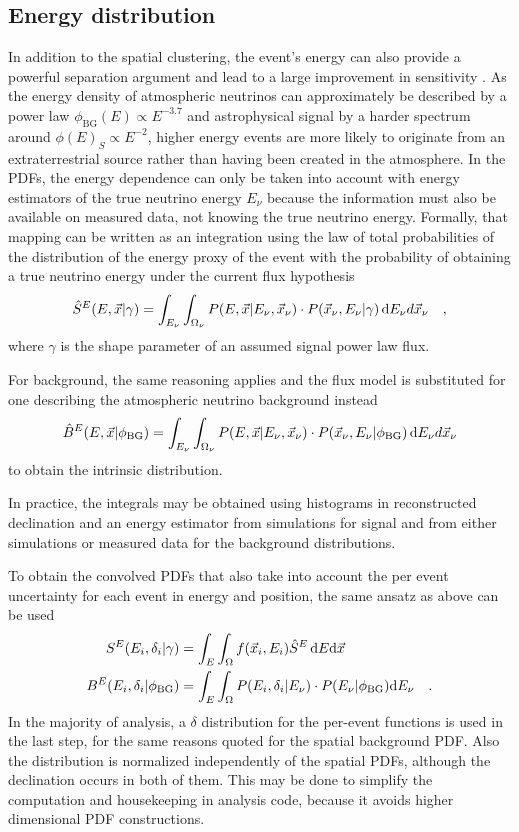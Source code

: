 \subsection{Energy distribution}
In addition to the spatial clustering, the event's energy can also provide a powerful separation argument and lead to a large improvement in sensitivity .
As the energy density of atmospheric neutrinos can approximately be described by a power law $\phi_\mathrm{BG}(E) \propto E^{-3.7}$ and astrophysical signal by a harder spectrum around $\phi(E)_S \propto E^{-2}$, higher energy events are more likely to originate from an extraterrestrial source rather than having been created in the atmosphere.
In the PDFs, the energy dependence can only be taken into account with energy estimators of the true neutrino energy $E_\nu$ because the information must also be available on measured data, not knowing the true neutrino energy.
Formally, that mapping can be written as an integration using the law of total probabilities of the distribution of the energy proxy of the event with the probability of obtaining a true neutrino energy under the current flux hypothesis
\begin{equation}
  \hat{S}^E(E, \vec{x}|\gamma) =
    \int_{E_\nu}\int_{\Omega_\nu}
    P(E, \vec{x}|E_\nu, \vec{x}_\nu) \cdot P(\vec{x}_\nu, E_\nu|\gamma)
    \,\mathrm{d}E_\nu d{\vec{x}_\nu}
    \quad\text{,}
\end{equation}
where $\gamma$ is the shape parameter of an assumed signal power law flux.

For background, the same reasoning applies and the flux model is substituted for one describing the atmospheric neutrino background instead
\begin{equation}
  \hat{B}^E(E, \vec{x}|\phi_\mathrm{BG}) =
    \int_{E_\nu}\int_{\Omega_\nu}
    P(E, \vec{x}|E_\nu, \vec{x}_\nu) \cdot P(\vec{x}_\nu, E_\nu|\phi_\mathrm{BG})
    \,\mathrm{d}E_\nu d{\vec{x}_\nu}
\end{equation}
to obtain the intrinsic distribution.

In practice, the integrals may be obtained using histograms in reconstructed declination and an energy estimator from simulations for signal and from either simulations or measured data for the background distributions.

To obtain the convolved PDFs that also take into account the per event uncertainty for each event in energy and position, the same ansatz as above can be used
\begin{align}
  S^E(E_i, \delta_i|\gamma) &=
    \int_E\int_\Omega f(\vec{x}_i, E_i)\hat{S}^E\,\mathrm{d}E\mathrm{d}\vec{x} \\
  B^E(E_i, \delta_i|\phi_\mathrm{BG}) &=
    \int_E\int_\Omega P(E_i,\delta_i|E_\nu)\cdot P(E_\nu|\phi_\mathrm{BG})
      \mathrm{d}E_\nu
    \quad\text{.}
\end{align}
In the majority of analysis, a $\delta$ distribution for the per-event functions is used in the last step, for the same reasons quoted for the spatial background PDF.
Also the distribution is normalized independently of the spatial PDFs, although the declination occurs in both of them.
This may be done to simplify the computation and housekeeping in analysis code, because it avoids higher dimensional PDF constructions.

